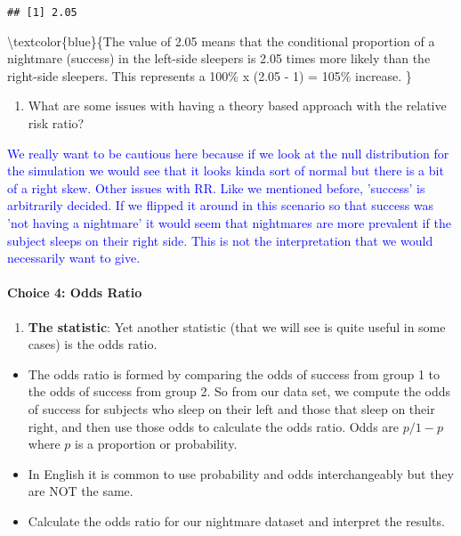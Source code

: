\documentclass[
]{article}
\providecommand{\tightlist}{%
  \setlength{\itemsep}{0pt}\setlength{\parskip}{0pt}}
\begin{document}
\begin{verbatim}
## [1] 2.05
\end{verbatim}

\textbackslash textcolor\{blue\}\{The value of 2.05 means that the
conditional proportion of a nightmare (success) in the left-side
sleepers is 2.05 times more likely than the right-side sleepers. This
represents a 100\% x (2.05 - 1) = 105\% increase. \}

\vspace{0.5in}

\begin{enumerate}
\def\labelenumi{(\arabic{enumi})}
\setcounter{enumi}{15}
\tightlist
\item
  What are some issues with having a theory based approach with the
  relative risk ratio?
\end{enumerate}

\textcolor{blue}{We really want to be cautious here because if we look at the null distribution for the simulation we would see that it looks kinda sort of normal but there is a bit of a right skew. Other issues with RR. Like we mentioned before, 'success' is arbitrarily decided. If we flipped it around in this scenario so that success was 'not having a nightmare' it would seem that nightmares are more prevalent if the subject sleeps on their right side. This is not the interpretation that we would necessarily want to give.}

\vspace{0.5in}

\hypertarget{choice-4-odds-ratio}{%
\paragraph{Choice 4: Odds Ratio}\label{choice-4-odds-ratio}}

\begin{enumerate}
\def\labelenumi{(\arabic{enumi})}
\setcounter{enumi}{16}
\tightlist
\item
  \textbf{The statistic}: Yet another statistic (that we will see is
  quite useful in some cases) is the odds ratio.
\end{enumerate}

\begin{itemize}
\item
  The odds ratio is formed by comparing the odds of success from group 1
  to the odds of success from group 2. So from our data set, we compute
  the odds of success for subjects who sleep on their left and those
  that sleep on their right, and then use those odds to calculate the
  odds ratio. Odds are \(p/1-p\) where \(p\) is a proportion or
  probability.
\item
  In English it is common to use probability and odds interchangeably
  but they are NOT the same.
\item
  Calculate the odds ratio for our nightmare dataset and interpret the
  results.
\end{itemize}
\end{document}
